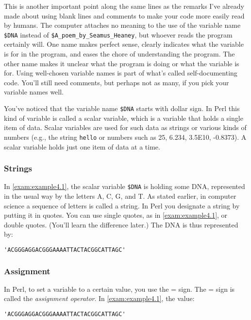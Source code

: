 This is another important point along the same lines as the remarks I've already made about using blank lines and comments to make your code more easily read by humans. The computer attaches no meaning to the use of the variable name \verb|$DNA| instead of \verb|$A_poem_by_Seamus_Heaney|, but whoever reads the program certainly will. One name makes perfect sense, clearly indicates what the variable is for in the program, and eases the chore of understanding the program. The other name makes it unclear what the program is doing or what the variable is for. Using well-chosen variable names is part of what's called self-documenting code. You'll still need comments, but perhaps not as many, if you pick your variable names well.

You've noticed that the variable name \verb|$DNA| starts with dollar sign. In Perl this kind of variable is called a scalar variable, which is a variable that holds a single item of data. Scalar variables are used for such data as strings or various kinds of numbers (e.g., the string \verb|hello| or numbers such as 25, 6.234, 3.5E10, -0.8373). A scalar variable holds just one item of data at a time. 

\subsubsection{Strings}
In \autoref{exam:example4.1}, the scalar variable \verb|$DNA| is holding some DNA, represented in the usual way by the letters A, C, G, and T. As stated earlier, in computer science a sequence of letters is called a string. In Perl you designate a string by putting it in quotes. You can use single quotes, as in \autoref{exam:example4.1}, or double quotes. (You'll learn the difference later.) The DNA is thus represented by:

\begin{lstlisting}
'ACGGGAGGACGGGAAAATTACTACGGCATTAGC'
\end{lstlisting}

\subsubsection{Assignment}
\label{sect:section4.2.4.3}
In Perl, to set a variable to a certain value, you use the = sign. The = sign is called the \textit{assignment operator}. In \autoref{exam:example4.1}, the value: 

\begin{lstlisting}
'ACGGGAGGACGGGAAAATTACTACGGCATTAGC' 
\end{lstlisting}

